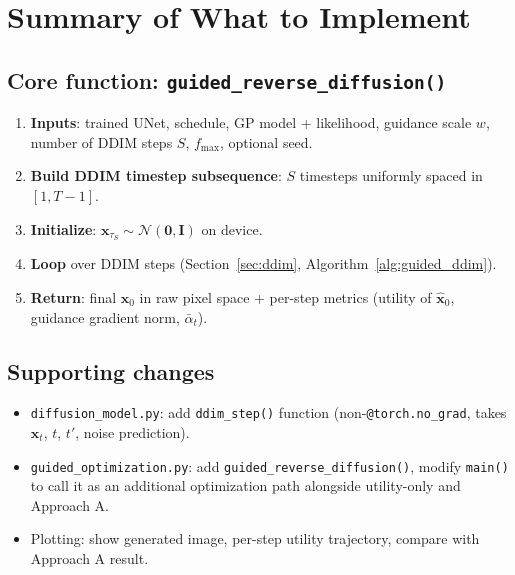 \documentclass[11pt]{article}
\newcommand{\xb}{\mathbf{x}}
\newcommand{\Ib}{\mathbf{I}}
\newcommand{\alphabar}{\bar{\alpha}}
\begin{document}
\section{Summary of What to Implement}
\label{sec:implementation}

\subsection{Core function: \texttt{guided\_reverse\_diffusion()}}

\begin{enumerate}
    \item \textbf{Inputs}: trained UNet, schedule, GP model + likelihood, guidance scale $w$,
          number of DDIM steps $S$, $f_{\max}$, optional seed.
    \item \textbf{Build DDIM timestep subsequence}: $S$ timesteps uniformly spaced in $[1, T{-}1]$.
    \item \textbf{Initialize}: $\xb_{\tau_S} \sim \mathcal{N}(\mathbf{0}, \Ib)$ on device.
    \item \textbf{Loop} over DDIM steps (Section~\ref{sec:ddim}, Algorithm~\ref{alg:guided_ddim}).
    \item \textbf{Return}: final $\xb_0$ in raw pixel space + per-step metrics
          (utility of $\hat{\xb}_0$, guidance gradient norm, $\alphabar_t$).
\end{enumerate}

\subsection{Supporting changes}

\begin{itemize}[nosep]
    \item \texttt{diffusion\_model.py}: add \texttt{ddim\_step()} function
          (non-\texttt{@torch.no\_grad}, takes $\xb_t$, $t$, $t'$, noise prediction).
    \item \texttt{guided\_optimization.py}: add \texttt{guided\_reverse\_diffusion()},
          modify \texttt{main()} to call it as an additional optimization path alongside
          utility-only and Approach A.
    \item Plotting: show generated image, per-step utility trajectory, compare with
          Approach A result.
\end{itemize}
\end{document}

